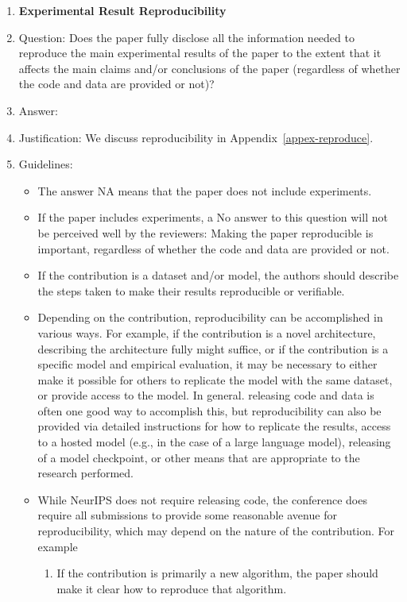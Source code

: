 \documentclass{article}
\theoremstyle{plain}
\theoremstyle{definition}
\theoremstyle{remark}
\begin{document}
\begin{enumerate}
    \item {\bf Experimental Result Reproducibility}
    \item[] Question: Does the paper fully disclose all the information needed to reproduce the main experimental results of the paper to the extent that it affects the main claims and/or conclusions of the paper (regardless of whether the code and data are provided or not)?
    \item[] Answer:\answerYes{} %
    \item[] Justification: We discuss reproducibility in Appendix~\ref{appex-reproduce}.
    \item[] Guidelines:
    \begin{itemize}
        \item The answer NA means that the paper does not include experiments.
        \item If the paper includes experiments, a No answer to this question will not be perceived well by the reviewers: Making the paper reproducible is important, regardless of whether the code and data are provided or not.
        \item If the contribution is a dataset and/or model, the authors should describe the steps taken to make their results reproducible or verifiable. 
        \item Depending on the contribution, reproducibility can be accomplished in various ways. For example, if the contribution is a novel architecture, describing the architecture fully might suffice, or if the contribution is a specific model and empirical evaluation, it may be necessary to either make it possible for others to replicate the model with the same dataset, or provide access to the model. In general. releasing code and data is often one good way to accomplish this, but reproducibility can also be provided via detailed instructions for how to replicate the results, access to a hosted model (e.g., in the case of a large language model), releasing of a model checkpoint, or other means that are appropriate to the research performed.
        \item While NeurIPS does not require releasing code, the conference does require all submissions to provide some reasonable avenue for reproducibility, which may depend on the nature of the contribution. For example
        \begin{enumerate}
            \item If the contribution is primarily a new algorithm, the paper should make it clear how to reproduce that algorithm.

\end{enumerate}
\end{itemize}
\end{enumerate}
\end{document}
